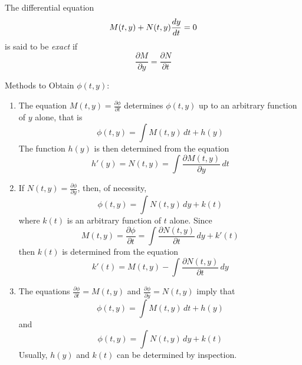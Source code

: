 \documentclass[12pt]{article}
\begin{document}
\begin{definition} The differential equation $$M(t, y) + N(t, y)\frac{dy}{dt} = 0$$ is said to be \textit{exact} if $$ \frac{\partial M}{\partial y} = \frac{\partial N}{\partial t} $$ \end{definition}
Methods to Obtain $\phi(t, y)$: \begin{enumerate} 
\item The equation $M(t, y) = \frac{\partial \phi}{\partial t}$ determines $\phi(t, y)$ up to an arbitrary function of $y$ alone, that is $$\phi(t, y) = \int M(t, y) \, dt + h(y)$$ The function $h(y)$ is then determined from the equation $$h'(y) = N(t, y) = \int \frac{\partial M(t, y)}{\partial y} \, dt $$ 
\item If $N(t, y) = \frac{\partial \phi}{\partial y}$, then, of necessity, $$\phi(t, y) = \int N(t, y) \, dy + k(t) $$ where $k(t)$ is an arbitrary function of $t$ alone. Since $$M(t, y) = \frac{\partial \phi}{\partial t} = \int \frac{\partial N(t, y)}{\partial t} \, dy + k'(t) $$ then $k(t)$ is determined from the equation $$k'(t) = M(t, y) - \int \frac{\partial N(t, y)}{\partial t} \, dy $$ 
\item The equations $\frac{\partial \phi}{\partial t} = M(t, y)$ and $\frac{\partial \phi}{\partial y} = N(t, y)$ imply that $$\phi(t, y) = \int M(t, y) \, dt + h(y)$$ and $$\phi(t, y) = \int N(t, y) \, dy + k(t) $$ Usually, $h(y)$ and $k(t)$ can be determined by inspection. \end{enumerate} 
\end{document}
